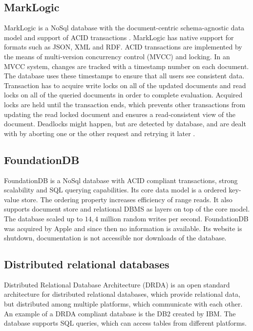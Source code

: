 \subsection{MarkLogic}
MarkLogic is a NoSql database with the document-centric schema-agnostic data model \cite{markLogicDataModel} and support of ACID transactions \cite{markLogicAcid}.
MarkLogic has native support for formats such as JSON, XML and RDF. ACID transactions are implemented by the means of multi-version concurrency control (MVCC) and locking. In an MVCC system, changes are tracked with a timestamp number on each document. 
The database uses these timestamps to ensure that all users see consistent data. 
Transaction has to acquire write locks on all of the updated documents and read locks on all of the queried documents in order to complete evaluation. Acquired locks are held until the transaction ends, which prevents other transactions from updating the read locked document and ensures a read-consistent view of the document. 
Deadlocks might happen, but are detected by database, and are dealt with by aborting one or the other request and retrying it later \cite{markLogicUnderstandingTransactions}.


\subsection{FoundationDB}
FoundationDB is a NoSql database with ACID compliant transactions, strong scalability and SQL querying capabilities.
Its core data model is a ordered key-value store. The ordering property increases efficiency of range reads. It also supports document store and relational DBMS as layers on top of the core model.  The database scaled up to $14,4$ million random writes per second. FoundationDB was acquired by Apple \cite{foundationDbAcquired} and since then no information is available. Its website is shutdown, documentation is not accessible nor downloads of the database.


\subsection{Distributed relational databases}
Distributed Relational Database Architecture (DRDA) \cite{drda} is an open standard architecture for distributed relational databases, which provide relational data, but distributed among multiple platforms, which communicate with each other. An example of a DRDA compliant database is the DB2 created by IBM. The database supports SQL queries, which can access tables from different platforms. 

